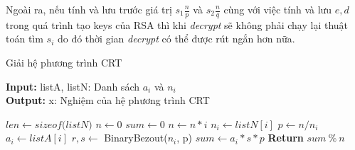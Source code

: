 Ngoài ra, nếu tính và lưu trước giá trị $s_1\frac{n}{p}$ và $s_2\frac{n}{q}$ cùng với việc tính và lưu $e, d$ trong quá trình tạo keys của RSA thì khi \textit{decrypt} sẽ không phải 
chạy lại thuật toán tìm $s_i$ do đó thời gian \textit{decrypt} có thể được rút ngắn hơn nữa.

\begin{algorithm}[H]
\caption{Giải hệ phương trình CRT}\label{alg:solve-crt}
\hspace*{\algorithmicindent} \textbf{Input:} listA, listN: Danh sách $a_i$ và $n_i$\\
\hspace*{\algorithmicindent} \textbf{Output:} x: Nghiệm của hệ phương trình CRT
\begin{algorithmic}[1]
\State $len \gets \textit{sizeof(listN)}$
\State $n \gets 0$
\State $sum \gets 0$
\State $n \gets n*i$
\EndFor
{}
\State $n_i \gets listN[i]$
\State $p \gets n/n_i$
\State $a_i \gets listA[i]$
\State $r,s \gets$ BinaryBezout($n_i$, p)
\State $sum \gets a_i*s*p$
\EndFor
\State \textbf{Return } $sum\ \%\ n$
\EndProcedure
\end{algorithmic}
\end{algorithm}